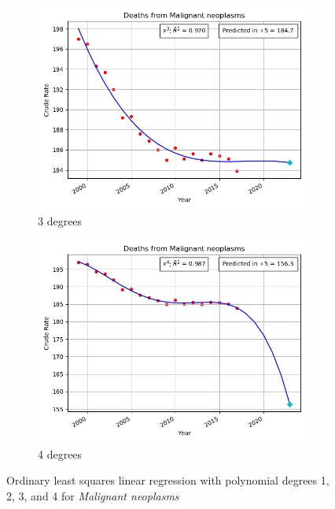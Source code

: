 \documentclass[12pt, a4paper, twocolumn]{article}
\begin{document}
\begin{figure}
  \begin{subfigure}[b]{0.4\textwidth}
    \includegraphics[width=\textwidth]{Malignant_neoplasms_3.png}
    \caption{3 degrees}
    \label{fig:deg3}
  \end{subfigure}

  \begin{subfigure}[b]{0.4\textwidth}
    \includegraphics[width=\textwidth]{Malignant_neoplasms_4.png}
    \caption{4 degrees}
    \label{fig:deg4}
  \end{subfigure}
  \caption{Ordinary least squares linear regression with polynomial degrees 1, 2, 3, and 4 for \textit{Malignant neoplasms}}\label{fig:neoplasmregs}
\end{figure}


\nocite{*}

\end{document}
